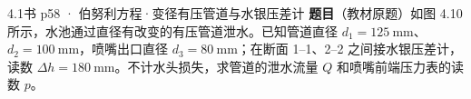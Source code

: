 \begin{liti}{4.1}{书 p58 · 伯努利方程·变径有压管道与水银压差计}
\textbf{题目}（教材原题）如图 4.10 所示，水池通过直径有改变的有压管道泄水。已知管道直径 $d_1=125\ \mathrm{mm}$、
$d_2=100\ \mathrm{mm}$，喷嘴出口直径 $d_3=80\ \mathrm{mm}$；在断面 1--1、2--2 之间接水银压差计，
读数 $\Delta h=180\ \mathrm{mm}$。不计水头损失，求管道的泄水流量 $Q$ 和喷嘴前端压力表的读数 $p$。



\end{liti}
